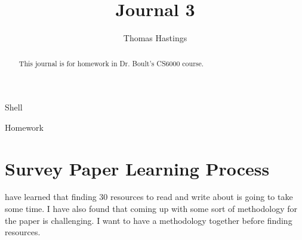 \documentclass[journal]{IEEEtran}
\begin{document}
  \title{Journal 3}
  \author{Thomas Hastings}%
  
  {Shell}
  \maketitle
  
  \begin{abstract}
  This journal is for homework in Dr. Boult's CS6000 course.
  \end{abstract}
  
  \begin{IEEEkeywords}
  Homework
  \end{IEEEkeywords}
  
  
  \section{Survey Paper Learning Process}
   have learned that finding 30 resources to read and write about is going to take some time. I have also found that coming up with some sort of methodology for the paper is challenging. I want to have a methodology together before finding resources. 
  
  
  
  
\end{document}
